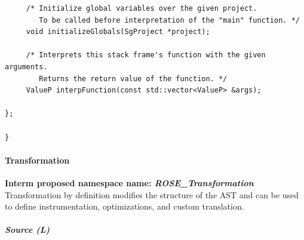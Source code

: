 \begin{enumerate}
\begin{enumerate}
\begin{lstlisting}
     /* Initialize global variables over the given project.
        To be called before interpretation of the "main" function. */
     void initializeGlobals(SgProject *project);

     /* Interprets this stack frame's function with the given arguments.
        Returns the return value of the function. */
     ValueP interpFunction(const std::vector<ValueP> &args);

};

}
\end{lstlisting}
   \end{enumerate}

\end{enumerate}

\paragraph{Transformation}
{\bf Interm proposed namespace name: {\em ROSE\_Transformation}} \\
   Transformation by definition modifies the structure of the AST and can be used
to define instrumentation, optimizations, and custom translation.
\subparagraph{Source (L)}

